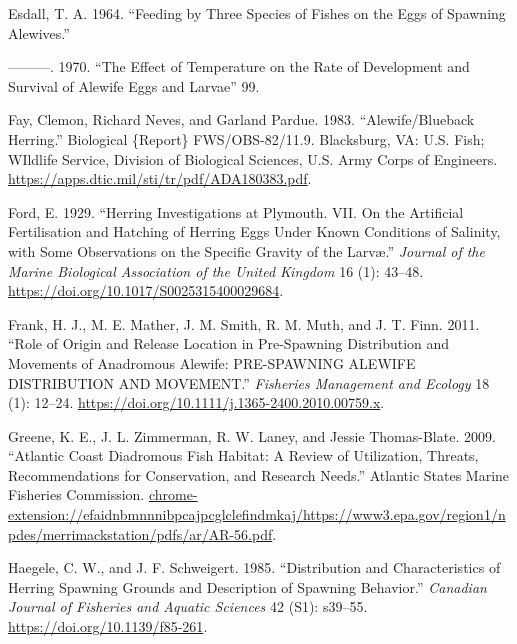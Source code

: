 \documentclass[
]{book}
\newlength{\cslhangindent}
\newlength{\cslentryspacingunit} %
\newenvironment{CSLReferences}[2] %
 {%
  \setlength{\parindent}{0pt}
  \ifodd #1
  \let\oldpar\par
  \def\par{\hangindent=\cslhangindent\oldpar}
  \fi
  \setlength{\parskip}{#2\cslentryspacingunit}
 }%
 {}
\begin{document}
\begin{CSLReferences}{1}{0}
\leavevmode{}%
Esdall, T. A. 1964. {``Feeding by Three Species of Fishes on the Eggs of Spawning Alewives.''}

\leavevmode{}%
---------. 1970. {``The Effect of Temperature on the Rate of Development and Survival of Alewife Eggs and Larvae''} 99.

\leavevmode{}%
Fay, Clemon, Richard Neves, and Garland Pardue. 1983. {``Alewife/{Blueback} {Herring}.''} Biological \{Report\} FWS/OBS-82/11.9. Blacksburg, VA: U.S. Fish; WIldlife Service, Division of Biological Sciences, U.S. Army Corps of Engineers. \url{https://apps.dtic.mil/sti/tr/pdf/ADA180383.pdf}.

\leavevmode{}%
Ford, E. 1929. {``Herring {Investigations} at {Plymouth}. {VII}. {On} the {Artificial} {Fertilisation} and {Hatching} of {Herring} {Eggs} Under Known {Conditions} of {Salinity}, with Some {Observations} on the {Specific} {Gravity} of the {Larvæ}.''} \emph{Journal of the Marine Biological Association of the United Kingdom} 16 (1): 43--48. \url{https://doi.org/10.1017/S0025315400029684}.

\leavevmode{}%
Frank, H. J., M. E. Mather, J. M. Smith, R. M. Muth, and J. T. Finn. 2011. {``Role of Origin and Release Location in Pre-Spawning Distribution and Movements of Anadromous Alewife: {PRE}-{SPAWNING} {ALEWIFE} {DISTRIBUTION} {AND} {MOVEMENT}.''} \emph{Fisheries Management and Ecology} 18 (1): 12--24. \url{https://doi.org/10.1111/j.1365-2400.2010.00759.x}.

\leavevmode{}%
Greene, K. E., J. L. Zimmerman, R. W. Laney, and Jessie Thomas-Blate. 2009. {``Atlantic {Coast} {Diadromous} {Fish} {Habitat}: {A} {Review} of {Utilization}, {Threats}, {Recommendations} for {Conservation}, and {Research} {Needs}.''} Atlantic States Marine Fisheries Commission. \url{chrome-extension://efaidnbmnnnibpcajpcglclefindmkaj/https://www3.epa.gov/region1/npdes/merrimackstation/pdfs/ar/AR-56.pdf}.

\leavevmode{}%
Haegele, C. W., and J. F. Schweigert. 1985. {``Distribution and {Characteristics} of {Herring} {Spawning} {Grounds} and {Description} of {Spawning} {Behavior}.''} \emph{Canadian Journal of Fisheries and Aquatic Sciences} 42 (S1): s39--55. \url{https://doi.org/10.1139/f85-261}.


\end{CSLReferences}
\end{document}
